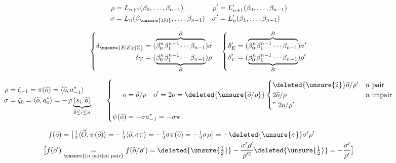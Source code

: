 \[
\begin{aligned}
\rho&=L_{n+1}(\beta_0,\ldots,\beta_{n-1})&\rho'&=L'_{n+1}(\beta_0,\ldots,\beta_{n-1})\\
\sigma&=L_n(\beta_{\unsure{1|0}},\ldots,\beta_{n-1})&\sigma'&=L'_n(\beta_1,\ldots,\beta_{n-1})
\end{aligned}
\]

\[
\left\{\begin{aligned}\delta_{\unsure{E|\mathcal E|\varepsilon|\Sigma}}&=(\overbrace{\beta_0^n\beta_1^{n-1}\cdots\beta_{n-1}}^B)\sigma\\
\delta_V&=(\underbrace{\beta_0^n\beta_1^{n-1}\cdots\beta_{n-1}}_B)\rho\end{aligned}\right.
\quad
\left\{\begin{aligned}\delta'_E&=(\overbrace{\beta_0^n\beta_1^{n-1}\cdots\beta_{n-1}}^B)\sigma'\\
\delta'_V&=(\underbrace{\beta_0^n\beta_1^{n-1}\cdots\beta_{n-1}}_B)\rho'\end{aligned}\right.
\]


\[
\begin{aligned}
\rho&=\zeta_{-1}=\pi(\widetilde{o})=\langle\widetilde{o},a_{-1}^*\rangle\\
\sigma&=\zeta_0=\langle\widetilde{o},a_0^*\rangle=-\varphi\underbrace{(s_i,\widetilde{o})}_{0\le i\le n}
\end{aligned}
\qquad
\left\{\begin{aligned}
o&=\widetilde{o}/\rho\quad o'=2o=\deleted{\unsure{\widetilde{o}/\rho}}\begin{cases}\deleted{\unsure{2}}\widetilde{o}/\rho'&n\ \text{pair}\\2\widetilde{o}/\rho&n\ \text{impair}\\ \text{''}\ 2\bar{o}/\rho'&\end{cases}\\
\psi(\widetilde{o})&=-\sigma a_{-1}^*=-\sigma\pi
\end{aligned}\right.
\]

\[
\begin{aligned}
f(\widetilde{o})&=\bigl[\tfrac12\langle\widetilde{O},\psi(\widetilde{o})\rangle=-\tfrac12\langle\widetilde{o},\sigma\pi\rangle=-\tfrac12\sigma\pi(\widetilde{o})=-\tfrac12\sigma\rho\bigr]=-\deleted{\unsure{\sigma}}\sigma'\rho'\\
\bigl[f(o')&\underset{\text{\unsure{(n pair|en pair}}}{=} f(\widetilde{o}/\rho')=\deleted{\unsure{\tfrac12}}-\frac{\sigma'\rho'}{\rho'^2}\deleted{\unsure{\tfrac12}}=-\frac{\sigma'}{\rho'}\bigr]
\end{aligned}
\]

